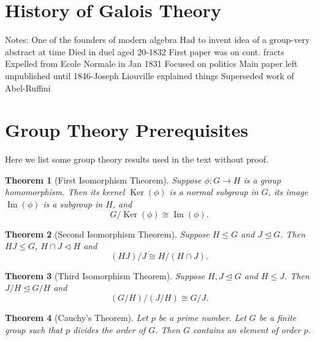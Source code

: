\documentclass[12pt]{article}
\newtheorem{theorem}{Theorem}
\theoremstyle{definition}
\begin{document}
\section{History of Galois Theory}

Notes:
One of the founders of modern algebra
Had to invent idea of a group-very abstract at time
Died in duel aged 20-1832
First paper was on cont. fracts
Expelled from Ecole Normale in Jan 1831
Focused on politics
Main paper left unpublished until 1846-Joseph Liouville explained things
Superseded work of Abel-Ruffini

\newpage
\appendix
\section{Group Theory Prerequisites}
Here we list some group theory results used in the text without proof. 

\begin{theorem}[First Isomorphism Theorem] \label{thm:first-iso}
	Suppose $\phi: G \to H$ is a group homomorphism. Then its kernel $\operatorname{Ker}(\phi)$ is a normal subgroup in $G$, its image $\operatorname{Im}(\phi)$ is a subgroup in $H$, and 
	$$
	G / \operatorname{Ker}(\phi) \cong \operatorname{Im}(\phi).
	$$
\end{theorem}

\begin{theorem}[Second Isomorphism Theorem] \label{thm:second-iso}
	Suppose $H \le G$ and $J \trianglelefteq G$. Then $HJ \le G$, $H \cap J \triangleleft H$ and $$
	(HJ) / J \cong H / (H \cap J). 
	$$
\end{theorem}
\begin{theorem}[Third Isomorphism Theorem] \label{thm:third-iso}
	Suppose $H, J \trianglelefteq G$ and $H \le J$. Then $J/H \trianglelefteq G/H$ and $$
	(G/H)/(J/H) \cong G / J.    $$
\end{theorem}

\begin{theorem}[Cauchy's Theorem] \label{thm:cauchy}
	Let $p$ be a prime number. Let $G$ be a finite group such that $p$ divides the order of $G$. Then $G$ contains an element of order $p$. 
\end{theorem}

\newpage

\end{document}

